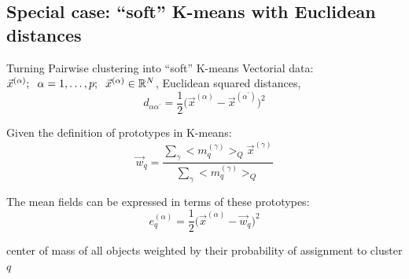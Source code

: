 \subsection{Special case: ``soft'' K-means with Euclidean distances}

\begin{frame}{Turning Pairwise clustering into ``soft'' K-means}
Vectorial data: $\vec{x}^{(\alpha)}; \hspace{0.2cm} \alpha = 1,
\ldots, p; \hspace{0.2cm} \vec{x}^{(\alpha)} \in \mathbb{R}^N$,  Euclidean squared distances,
$$
	d_{\alpha \alpha^{'}} 
	= \frac{1}{2} \big( \vec{x}^{(\alpha)} - \vec{x}^{(\alpha^{'})}
		\big)^2
$$

Given the definition of prototypes in K-means:
\begin{equation}
	\vec{w}_q 
	= \frac{\sum\limits_{\gamma} \big< m_q^{(\gamma)} \big>_Q 
		\vec{x}^{(\gamma)}}{\sum\limits_{\gamma}
		\big< m_q^{(\gamma)} \big>_Q} 
\end{equation}

The mean fields can be expressed in terms of these prototypes:
\begin{equation}
	e_q^{(\alpha)} 
	= \frac{1}{2} \big( \vec{x}^{(\alpha)} - \vec{w}_q \big)^2
\end{equation}

\begin{itemize}
\itr center of mass of all objects weighted by their probability of assignment to cluster $q$
\end{itemize}

\end{frame}

